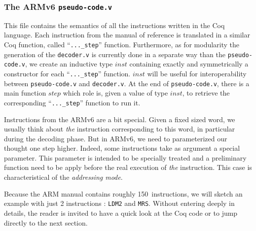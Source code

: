 \documentclass[a4paper, 11pt]{article}
\begin{document}
\subsubsection{The ARMv6 {\tt pseudo-code.v}}
This file contains the semantics of all the instructions written in the Coq language. Each instruction from the manual of reference is translated in a similar Coq function, called ``\verb|..._step|'' function. 
Furthermore, as for modularity the generation of the {\tt decoder.v} is currently done in a separate way than the {\tt pseudo-code.v}, we create an inductive type $inst$ containing exactly and symmetrically a constructor for each ``\verb|..._step|'' function. $inst$ will be useful for interoperability between {\tt pseudo-code.v} and {\tt decoder.v}. At the end of {\tt pseudo-code.v}, there is a main function $step$ which role is, given a value of type $inst$, to retrieve the corresponding ``\verb|..._step|'' function to run it.

Instructions from the ARMv6 are a bit special. Given a fixed sized word, we usually think about \emph{the} instruction corresponding to this word, in particular during the decoding phase. But in ARMv6, we need to parameterized our thought one step higher. Indeed, some instructions take as argument a special parameter. This parameter is intended to be specially treated and a preliminary function need to be apply before the real execution of \emph{the} instruction. This case is characteristical of the \emph{addressing mode}.

Because the ARM manual contains roughly 150~instructions, we will sketch an example with just 2 instructions : {\tt LDM2} and {\tt MRS}. Without entering deeply in details, the reader is invited to have a quick look at the Coq code or to jump directly to the next section.
\end{document}
